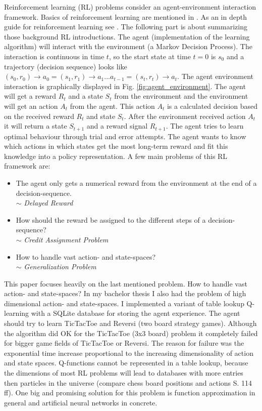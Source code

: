 \documentclass[conference]{IEEEtran}
\begin{document}
Reinforcement learning (RL) problems consider an agent-environment interaction framework. Basics of reinforcement learning are mentioned in \cite{DBLP:journals/corr/MnihBMGLHSK16, DBLP:journals/corr/HasseltGS15, DRL:HumanLevelControl, DRL:Silver_2016, mnih-atari-2013}. As an in depth guide for reinforcement learning see \cite{sutton_barto_98}. The following part is about summarizing those background RL introductions. The agent (implementation of the learning algorithm) will interact with the environment (a Markov Decision Process). The interaction is continuous in time $t$, so the start state at time $t = 0$ is $s_0$ and a trajectory (decision sequence) looks like $(s_0, r_0) \rightarrow a_0 = (s_1, r_1) \rightarrow a_1 ... a_{t-1} = (s_t, r_t) \rightarrow a_t$. The agent environment interaction is graphically displayed in Fig. \ref{fig:agent_environment}. The agent will get a reward $R_t$ and a state $S_t$ from the environment and the environment will get an action $A_t$ from the agent. This action $A_t$ is a calculated decision based on the received reward $R_t$ and state $S_t$. After the environment received action $A_t$ it will return a state $S_{t+1}$ and a reward signal $R_{t+1}$. The agent tries to learn optimal behaviour through trial and error attempts. The agent wants to know which actions in which states get the most long-term reward and fit this knowledge into a policy representation. A few main problems of this RL framework are: 
\begin{itemize}
\item The agent only gets a numerical reward from the environment at the end of a decision-sequence. \\ $\sim$ \textit{Delayed Reward}
\item How should the reward be assigned to the different steps of a decision-sequence? \\ $\sim$ \textit{Credit Assignment Problem}
\item How to handle vast action- and state-spaces? \\ $\sim$ \textit{Generalization Problem}
\end{itemize}

This paper focuses heavily on the last mentioned problem. How to handle vast action- and state-spaces? In my bachelor thesis I also had the problem of high dimensional action- and state-spaces. I implemented a variant of table lookup Q-learning with a SQLite database for storing the agent experience. The agent should try to learn TicTacToe and Reversi (two board strategy games). Although the algorithm did OK for the TicTacToe (3x3 board) problem it completely failed for bigger game fields of TicTacToe or Reversi. The reason for failure was the exponential time increase proportional to the increasing dimensionality of action and state spaces. Q-functions cannot be represented in a table lookup, because the dimensions of most RL problems will lead to databases with more entries then particles in the universe (compare chess board positions and actions \cite{ertel_2009} S. 114 ff). One big and promising solution for this problem is function approximation in general and artificial neural networks in concrete.\\
 
\end{document}
